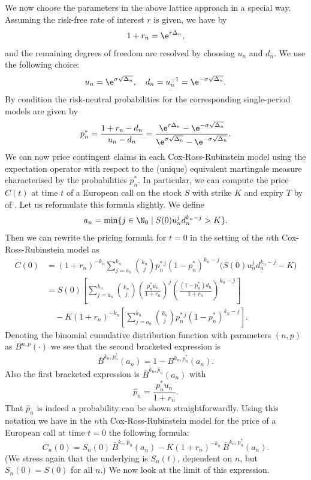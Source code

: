 We now choose the parameters in the above lattice approach in a special way. Assuming the risk-free rate of interest $r$ is given, we have by 
\[
	1 + r_n = \e^{r\Delta_n},
\]
and the remaining degrees of freedom are resolved by choosing $u_n$ and $d_n$. We use the following choice:
\[
	u_n = \e^{\sigma\sqrt{\Delta_n}}, \quad d_n = u_n^{-1} = \e^{-\sigma\sqrt{\Delta_n}}.
\]
By condition  the risk-neutral probabilities for the corresponding single-period models are given by
\[
	p_n^* = \frac{1 + r_n - d_n}{u_n - d_n}
	= \frac{\e^{r\Delta_n} - \e^{-\sigma\sqrt{\Delta_n}}}{\e^{\sigma\sqrt{\Delta_n}} - \e^{-\sigma\sqrt{\Delta_n}}}.
\]
We can now price contingent claims in each Cox-Ross-Rubinstein model using the expectation operator with respect to the (unique) equivalent martingale measure characterised by the probabilities $p_n^*$. In particular, we can compute the price $C(t)$ at time $t$ of a European call on the stock $S$ with strike $K$ and expiry $T$ by  of . Let us reformulate this formula slightly. We define
\begin{equation}\label{eq:MinSteps}
	a_n = \min\{ j \in \N_0 \mid S(0)u_n^j d_n^{k_n-j} > K \}.
\end{equation}
Then we can rewrite the pricing formula  for $t=0$ in the setting of the $n$th Cox-Ross-Rubinstein model as
\begin{align*}
	C(0) & = (1+r_n)^{-k_n} \sum_{j=a_n}^{k_n} \binom{k_n}{j} p_n^{*\,j} (1-p_n^*)^{k_n-j} \bigl(S(0)u_n^j d_n^{k_n-j} - K\bigr)                     \\
	     & = S(0)\left[\sum_{j=a_n}^{k_n} \binom{k_n}{j}\left(\frac{p_n^* u_n}{1+r_n}\right)^j\left(\frac{(1-p_n^*)d_n}{1+r_n}\right)^{k_n-j}\right] \\
	     & \quad - K(1+r_n)^{-k_n}\left[\sum_{j=a_n}^{k_n} \binom{k_n}{j} p_n^{*\,j} (1-p_n^*)^{k_n-j}\right].
\end{align*}
Denoting the binomial cumulative distribution function with parameters $(n,p)$ as $B^{n,p}(\cdot)$ we see that the second bracketed expression is
\[
	\bar{B}^{k_n,p_n^*}(a_n) = 1 - B^{k_n,p_n^*}(a_n).
\]
Also the first bracketed expression is $\bar{B}^{k_n,\hat{p}_n}(a_n)$ with
\[
	\hat{p}_n = \frac{p_n^* u_n}{1+r_n}.
\]
That $\hat{p}_n$ is indeed a probability can be shown straightforwardly. Using this notation we have in the $n$th Cox-Ross-Rubinstein model for the price of a European call at time $t=0$ the following formula:
\begin{equation}\label{eq:CRRPricing}
	C_n(0) = S_n(0)\,\bar{B}^{k_n,\hat{p}_n}(a_n) - K(1+r_n)^{-k_n}\,\bar{B}^{k_n,p_n^*}(a_n).
\end{equation}
(We stress again that the underlying is $S_n(t)$, dependent on $n$, but $S_n(0)=S(0)$ for all $n$.) We now look at the limit of this expression.

